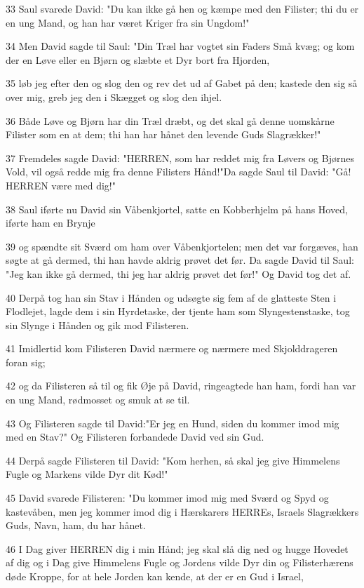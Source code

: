 \par 33 Saul svarede David: "Du kan ikke gå hen og kæmpe med den Filister; thi du er en ung Mand, og han har været Kriger fra sin Ungdom!"
\par 34 Men David sagde til Saul: "Din Træl har vogtet sin Faders Små kvæg; og kom der en Løve eller en Bjørn og slæbte et Dyr bort fra Hjorden,
\par 35 løb jeg efter den og slog den og rev det ud af Gabet på den; kastede den sig så over mig, greb jeg den i Skægget og slog den ihjel.
\par 36 Både Løve og Bjørn har din Træl dræbt, og det skal gå denne uomskårne Filister som en at dem; thi han har hånet den levende Guds Slagrækker!"
\par 37 Fremdeles sagde David: "HERREN, som har reddet mig fra Løvers og Bjørnes Vold, vil også redde mig fra denne Filisters Hånd!"Da sagde Saul til David: "Gå! HERREN være med dig!"
\par 38 Saul iførte nu David sin Våbenkjortel, satte en Kobberhjelm på hans Hoved, iførte ham en Brynje
\par 39 og spændte sit Sværd om ham over Våbenkjortelen; men det var forgæves, han søgte at gå dermed, thi han havde aldrig prøvet det før. Da sagde David til Saul: "Jeg kan ikke gå dermed, thi jeg har aldrig prøvet det før!" Og David tog det af.
\par 40 Derpå tog han sin Stav i Hånden og udsøgte sig fem af de glatteste Sten i Flodlejet, lagde dem i sin Hyrdetaske, der tjente ham som Slyngestenstaske, tog sin Slynge i Hånden og gik mod Filisteren.
\par 41 Imidlertid kom Filisteren David nærmere og nærmere med Skjolddrageren foran sig;
\par 42 og da Filisteren så til og fik Øje på David, ringeagtede han ham, fordi han var en ung Mand, rødmosset og smuk at se til.
\par 43 Og Filisteren sagde til David:"Er jeg en Hund, siden du kommer imod mig med en Stav?" Og Filisteren forbandede David ved sin Gud.
\par 44 Derpå sagde Filisteren til David: "Kom herhen, så skal jeg give Himmelens Fugle og Markens vilde Dyr dit Kød!"
\par 45 David svarede Filisteren: "Du kommer imod mig med Sværd og Spyd og kastevåben, men jeg kommer imod dig i Hærskarers HERREs, Israels Slagrækkers Guds, Navn, ham, du har hånet.
\par 46 I Dag giver HERREN dig i min Hånd; jeg skal slå dig ned og hugge Hovedet af dig og i Dag give Himmelens Fugle og Jordens vilde Dyr din og Filisterhærens døde Kroppe, for at hele Jorden kan kende, at der er en Gud i Israel,
